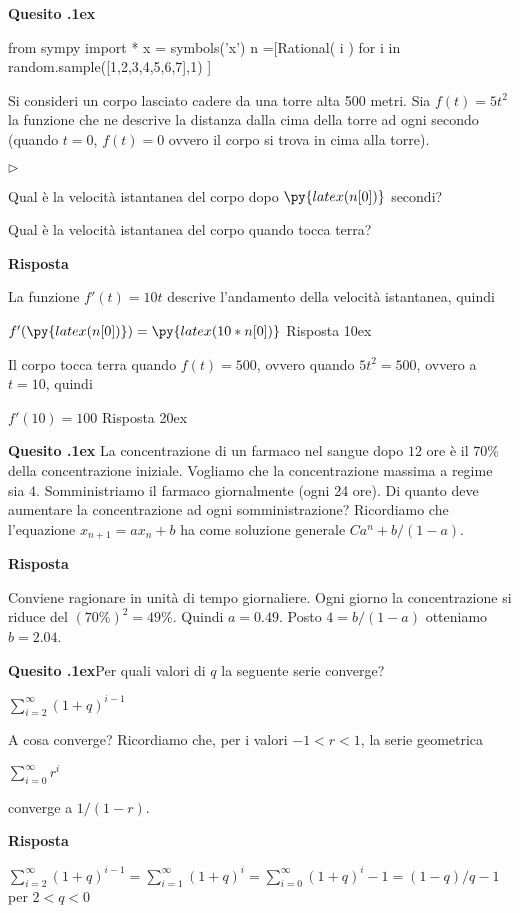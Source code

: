 \documentclass[11pt,twoside,a4paper]{article}
\newcommand{\mylabel}[1]{#1\hfill}
\renewenvironment{itemize}
  {\begin{list}{$\triangleright$}{%
   \setlength{\parskip}{0mm}
   \setlength{\topsep}{.4\baselineskip}
   \setlength{\rightmargin}{0mm}
   \setlength{\listparindent}{0mm}
   \setlength{\itemindent}{0mm}
   \setlength{\labelwidth}{2ex}
   \setlength{\itemsep}{.4\baselineskip}
   \setlength{\parsep}{0mm}
   \setlength{\partopsep}{0mm}
   \setlength{\labelsep}{1ex}
   \setlength{\leftmargin}{\labelwidth+\labelsep}
   \let\makelabel\mylabel}}{%
   \end{list}\vspace*{-1.3mm}}
\newcounter{quesito}
\newenvironment{question}{\addtocounter{quesito}{1}\par\textbf{Quesito \thequesito.\kern1ex}}{\vspace{0.5\parskip}}
\newenvironment{answer}{\par\textbf{Risposta\quad}}{\vspace{\parskip}}
\begin{document}
\begin{question}
\begin{pycode}
from sympy import *
x = symbols('x')
n =[Rational( i ) for i in random.sample([1,2,3,4,5,6,7],1) ]
\end{pycode}
Si consideri un corpo lasciato cadere da una torre alta 500 metri. Sia  $f(t) = 5 t^2$ la funzione che ne descrive la distanza dalla cima della torre ad ogni secondo (quando $t=0$, $f(t) = 0$ ovvero il corpo si trova in cima alla torre).
\begin{itemize}
\item[1.] Qual è la velocità istantanea del corpo dopo $\py{latex(n[0])}$ secondi?
\item[2.] Qual è la velocità istantanea del corpo quando tocca terra?
\end{itemize}
\begin{answer}

La funzione $f'(t) = 10 t$ descrive l'andamento della velocità istantanea, quindi

{\color{blue}
$f'(\py{latex(n[0])}) = \py{latex(10*n[0])}$ }
{\color{blue}
\hfill Risposta 1\kern0ex}

Il corpo tocca terra quando $f(t) = 500$, ovvero quando $5t^2 = 500$, ovvero a $t = 10$, quindi

{\color{blue}
$f'(10) = 100$
\hfill Risposta 2\kern0ex}

\end{answer}
\end{question}


\begin{question}
La concentrazione di un farmaco nel sangue dopo $12$ ore è il $70\%$ della concentrazione iniziale. Vogliamo che la concentrazione massima a regime sia $4$. Somministriamo il farmaco giornalmente (ogni 24 ore). Di quanto deve aumentare la concentrazione ad ogni somministrazione? Ricordiamo che l'equazione $x_{n+1}=ax_n +b$ ha come soluzione generale $Ca^n+b/(1-a)$.
\begin{answer}

Conviene ragionare in unità di tempo giornaliere. Ogni giorno la concentrazione si riduce del $(70\%)^2=49\%$. Quindi $a=0.49$. Posto $4=b/(1-a)$ otteniamo $b=2.04$.

\end{answer}
\end{question}


\begin{question}Per quali valori di $q$ la seguente serie converge?

\hfil$\displaystyle \sum^\infty_{i=2}(1+q)^{i-1}$

A cosa converge? Ricordiamo che, per i valori $-1<r<1$, la serie geometrica 

\hfil$\displaystyle \sum^\infty_{i=0}r^i$ 

converge a $1/(1-r)$. 
\begin{answer}

$\displaystyle \sum^\infty_{i=2}(1+q)^{i-1}=\sum^\infty_{i=1}(1+q)^{i}=\sum^\infty_{i=0}(1+q)^{i}-1=(1-q)/q -1$ per $2<q<0$

\end{answer}
\end{question}
\end{document}
